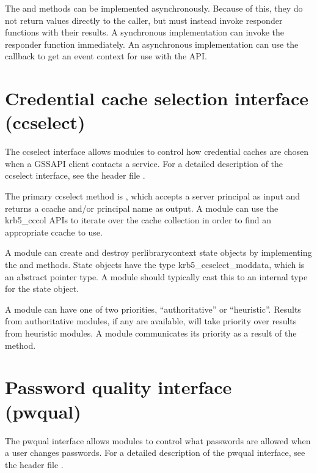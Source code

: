 \documentclass[letterpaper,10pt,english]{sphinxmanual}
\begin{document}
\sphinxAtStartPar
The  and  methods can be implemented
asynchronously.  Because of this, they do not return values directly
to the caller, but must instead invoke responder functions with their
results.  A synchronous implementation can invoke the responder
function immediately.  An asynchronous implementation can use the
callback to get an event context for use with the  API.

\sphinxstepscope


\section{Credential cache selection interface (ccselect)}
\label{\detokenize{plugindev/ccselect:credential-cache-selection-interface-ccselect}}\label{\detokenize{plugindev/ccselect:ccselect-plugin}}\label{\detokenize{plugindev/ccselect::doc}}
\sphinxAtStartPar
The ccselect interface allows modules to control how credential caches
are chosen when a GSSAPI client contacts a service.  For a detailed
description of the ccselect interface, see the header file
.

\sphinxAtStartPar
The primary ccselect method is , which accepts a server
principal as input and returns a ccache and/or principal name as
output.  A module can use the krb5\_cccol APIs to iterate over the
cache collection in order to find an appropriate ccache to use.

\sphinxAtStartPar
A module can create and destroy per\sphinxhyphen{}library\sphinxhyphen{}context state objects by
implementing the  and  methods.  State objects have
the type krb5\_ccselect\_moddata, which is an abstract pointer type.  A
module should typically cast this to an internal type for the state
object.

\sphinxAtStartPar
A module can have one of two priorities, “authoritative” or
“heuristic”.  Results from authoritative modules, if any are
available, will take priority over results from heuristic modules.  A
module communicates its priority as a result of the  method.

\sphinxstepscope


\section{Password quality interface (pwqual)}
\label{\detokenize{plugindev/pwqual:password-quality-interface-pwqual}}\label{\detokenize{plugindev/pwqual:pwqual-plugin}}\label{\detokenize{plugindev/pwqual::doc}}
\sphinxAtStartPar
The pwqual interface allows modules to control what passwords are
allowed when a user changes passwords.  For a detailed description of
the pwqual interface, see the header file .
\end{document}
